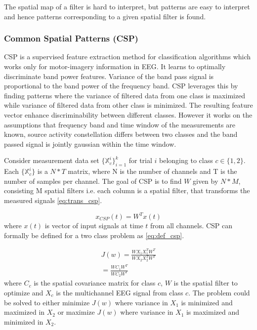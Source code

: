 The spatial map of a filter is hard to interpret, but patterns are easy to interpret and hence patterns corresponding to a given spatial filter is found.

\subsubsection{Common Spatial Patterns (CSP)}
CSP is a supervised feature extraction method for classification algorithms which works only for motor-imagery information in EEG. It learns to optimally discriminate band power features. Variance of the band pass signal is proportional to the band power of the frequency band. CSP leverages this by finding patterns where the  variance of filtered data from one class is maximized while variance of filtered data from other class is minimized. The resulting feature vector enhance discriminability between different classes. However it works on the assumptions that frequency band and time window of the measurements are known, source activity constellation differs between two classes and the band passed signal is jointly gaussian within the time window. 

Consider measurement data set $\{\mathbb{X}^{i}_{c}\}^{k}_{i=1}$ for trial $i$ belonging to class $c \in\{1,2\}$. Each $\{\mathbb{X}^{i}_{c}\}$ is a $N * T$ matrix, where N is the number of channels and T is the number of samples per channel. The goal of CSP is to find $W$ given by $N * M$, consisting M spatial filters i.e. each column is a  spatial filter, that transforms the measured signals \ref{eq:trans_csp}.

\begin{equation} \label{eq:trans_csp}
    x_{CSP}(t) = W^{T}x(t)
\end{equation}
where $x(t)$ is vector of input signals at time $t$ from all channels. CSP can formally be defined for a two class problem as \ref{eq:def_csp}.

\begin{equation} \label{eq:def_csp}
    \begin{split}
        J(w) = \frac{WX_{1}X_{1}^TW^T}{WX_{2}X_{2}^TW^T} \\
         = \frac{WC_{1}W^T}{WC_{2}W^T}
    \end{split}
\end{equation}
where $C_{c}$ is the spatial covariance matrix for class $c$, $W$ is the spatial filter to optimize and $X_{c}$ is the multichannel EEG signal from class $c$. The problem could be solved to either minimize $J(w)$ where variance in $X_{1}$ is minimized and maximized in $X_{2}$ or maximize $J(w)$ where variance in $X_{1}$ is maximized and minimized in $X_{2}$.

